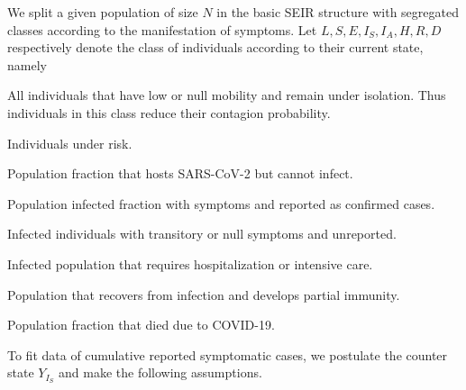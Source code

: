     We split a given population of size $N$ in the basic SEIR
structure with segregated classes according to the manifestation
of symptoms. Let $L, S, E, I_S, I_A, H, R, D$ respectively denote the
class of individuals according to their current state, namely
%
\begin{description}[%
    labelwidth=\widthof{\textbf{Infected-Asymptomatic $(I_A)$}},
    leftmargin=\widthof{\textbf{Infected-Asymptomatic $(I_A)$}},
    align=right%
]
    \item[Lockdown $(L)$:]
        All individuals that have low or null mobility and remain under
        isolation. Thus individuals in this class reduce their contagion probability.
    \item[Susceptible $(S)$:]
        Individuals under risk.
    \item[Exposed $(E)$:]
        Population fraction that hosts SARS-CoV-2 but cannot infect.
    \item[Infected-Symptomatic $(I_S)$:]
        Population infected fraction with symptoms and reported as confirmed
        cases.
    \item[Infected-Asymptomatic $(I_A)$:]
        Infected individuals with transitory or null symptoms and unreported.
    \item[Hospitalized $(H)$:]
        Infected population that requires hospitalization or intensive care.
    \item[Recover or removed $(R)$:]
        Population that recovers from infection and develops partial immunity.
    \item[Death $(D)$:]
        Population fraction that died due to COVID-19.
\end{description}
%
To fit data of cumulative reported symptomatic cases, we
postulate the counter state $Y_{I_S}$ and make the following assumptions.
%
%

